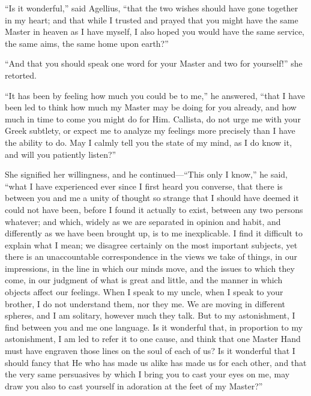 ``Is it wonderful,'' said Agellius, ``that the two
wishes should have gone together in my heart; and that while I trusted
and prayed that you might have the same Master in heaven as I have
myself, I also hoped you would have the same service, the same aims,
the same home upon earth?''

``And that you should speak one word for your Master and two
for yourself!'' she retorted.

``It has been by feeling how much you could be to me,'' he
answered, ``that I have been led to think how much my Master may
be doing for you already, and how much in time to come you might do
for Him. Callista, do not urge me with your Greek subtlety, or expect
me to analyze my feelings more precisely than I have the ability to
do. May I calmly tell you the state of my mind, as I do know it, and
will you patiently listen?''

She signified her willingness, and he continued—``This only I
know,'' he said, ``what I have experienced ever since I
first heard you converse, that there is between you and me a unity of
thought so strange that I should have deemed it could not have been,
before I found it actually to exist, between any two persons whatever;
and which, widely as we are separated in opinion and habit, and
differently as we have been brought up, is to me inexplicable. I find
it difficult to explain what I mean; we disagree certainly on the most
important subjects, yet there is an unaccountable correspondence in
the views we take of things, in our impressions, in the line in which
our minds move, and the issues to which they come, in our judgment of
what is great and little, and the manner in which objects affect our
feelings. When I speak to my uncle, when I speak to your brother, I do
not understand them, nor they me. We are moving in different spheres,
and I am solitary, however much they talk. But to my astonishment, I
find between you and me one language. Is it wonderful that, in
proportion to my astonishment, I am led to refer it to one cause, and
think that one Master Hand must have engraven those lines on the soul
of each of us? Is it wonderful that I should fancy that He who has
made us alike has made us for each other, and that the very same
persuasives by which I bring you to cast your eyes on me, may draw you
also to cast yourself in adoration at the feet of my Master?''

